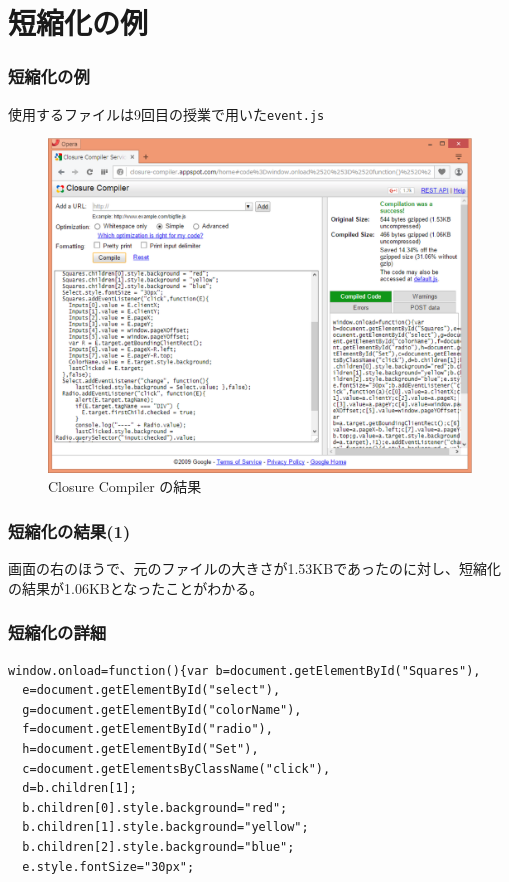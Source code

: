\documentclass[dvipsk]{beamer}
\begin{document}
\section{短縮化の例}
\begin{frame}[containsverbatim]
 \frametitle{短縮化の例}
 使用するファイルは9回目の授業で用いた\texttt{event.js}
 \begin{figure}[ht]
	\begin{center}
	 \includegraphics[width=1\textwidth]{../10-01closur-compiler-res01.eps}
	\end{center}
 \caption{Closure Compiler の結果}\label{closure-compiler-res01}
 \end{figure}
\end{frame}
\begin{frame}[containsverbatim]
\frametitle{短縮化の結果(1)}
 画面の右のほうで、元のファイルの大きさが1.53KBであったのに対し、短縮化
 の結果が1.06KBとなったことがわかる。
\end{frame}
\begin{frame}[containsverbatim]
 \frametitle{短縮化の詳細}
 {\footnotesize
\begin{verbatim}
window.onload=function(){var b=document.getElementById("Squares"),
  e=document.getElementById("select"),
  g=document.getElementById("colorName"),
  f=document.getElementById("radio"),
  h=document.getElementById("Set"),
  c=document.getElementsByClassName("click"),
  d=b.children[1];
  b.children[0].style.background="red";
  b.children[1].style.background="yellow";
  b.children[2].style.background="blue";
  e.style.fontSize="30px";
\end{verbatim}
 }
\end{frame}
\end{document}
